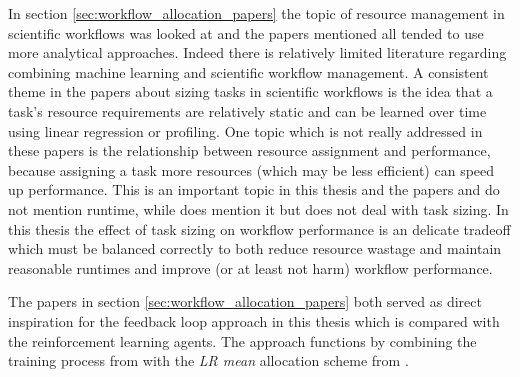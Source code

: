 In section \ref{sec:workflow_allocation_papers} the topic of resource management in scientific workflows was looked at and the papers mentioned all tended to use more analytical approaches. Indeed there is relatively limited literature regarding combining machine learning and scientific workflow management. A consistent theme in the papers about sizing tasks in scientific workflows is the idea that a task’s resource requirements are relatively static and can be learned over time using linear regression or profiling.  One topic which is not really addressed in these papers is the relationship between resource assignment and performance, because assigning a task more resources (which may be less efficient) can speed up performance. This is an important topic in this thesis and the papers \cite{FeedbackBasedAllocation} and \cite{tovarjob} do not mention runtime, while \cite{tarema} does mention it but does not deal with task sizing. In this thesis the effect of task sizing on workflow performance is an delicate tradeoff which must be balanced correctly to both reduce resource wastage and maintain reasonable runtimes and improve (or at least not harm) workflow performance.

The papers \cite{FeedbackBasedAllocation,tovarjob}in section \ref{sec:workflow_allocation_papers} both served as direct inspiration for the feedback loop approach in this thesis which is compared with the reinforcement learning agents. The approach functions by combining the training process from \cite{tovarjob} with the \textit{LR mean} allocation scheme from \cite{FeedbackBasedAllocation}.

